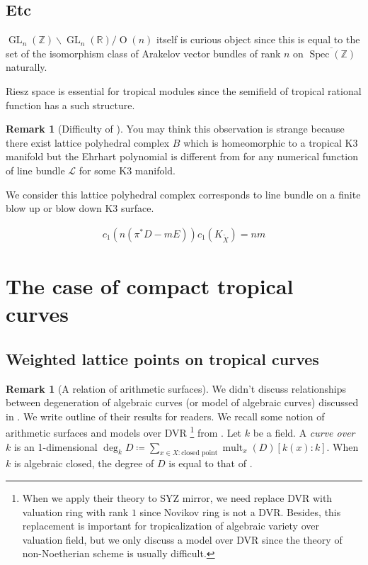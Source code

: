\documentclass[a4paper,dvipdfmx,reqno,12pt]{amsart}
\makeatletter
\newcommand{\ind}[2]{\emph{#1}\index{1{#2}@{#1}}}
\theoremstyle{definition}
\newtheorem{Rmk}[Thm]{Remark}
\newcommand{\deq}{\coloneqq}
\newcommand{\R}{\mathbb{R}}%
\newcommand{\Z}{\mathbb{Z}}%
\newcommand{\mcal}[1]{\mathcal{#1}}%
\newcommand{\opn}[1]{\operatorname{#1}}
\numberwithin{equation}{section}
\makeatother
\begin{document}
\subsection{Etc}

$\opn{GL}_{n}(\Z)\backslash \opn{GL}_{n}(\R)/\opn{O}(n)$ itself
is curious object since this is equal to the set of
the isomorphism class of Arakelov vector bundles of rank $n$ on $\overline{\opn{Spec}(\Z)}$ naturally.

Riesz space is essential for tropical modules since the semifield of tropical rational function
has a such structure.

\begin{Rmk}[Difficulty of ]

  You may think this observation is strange because
  there exist lattice polyhedral
  complex $B$ which is homeomorphic to
  a tropical K3 manifold but the Ehrhart polynomial is different from
  for any numerical function of line bundle $\mcal{L}$ for some K3 manifold.

  We consider this lattice polyhedral complex corresponds to line bundle on
  a finite blow up or blow down K3 surface.

  \begin{align}
    c_1(n(\pi^{*}D-mE))c_1(K_{\tilde{X}})=nm
  \end{align}




\end{Rmk}

\section{The case of compact tropical curves}

\subsection{Weighted lattice points on tropical curves}

\begin{Rmk}[A relation of arithmetic surfaces]
  We didn't discuss relationships between degeneration of algebraic curves (or model of algebraic curves) discussed in \cite{MR2448666,MR4131998,MR4251610}. We write outline of their results for readers. We recall some notion of arithmetic surfaces and models over DVR \footnote{When we apply their theory to SYZ mirror, we need replace DVR with valuation ring with rank $1$ since Novikov ring is not a DVR. Besides, this replacement is important for tropicalization of algebraic variety over valuation field, but we only discuss a model over DVR since the theory of non-Noetherian scheme is usually difficult.} from \cite[Chapter 9]{MR1917232}.
  Let $k$ be a field.
  A \ind{curve over $k$}{curve over k} is an 1-dimensional
  $\opn{deg}_k D\deq \sum_{x \in X: \text{closed point}}\opn{mult}_{x}(D)[k(x):k]$.
  When $k$ is algebraic closed, the degree of $D$ is equal to that of \cite[p.]{hartshorneAlgebraicGeometry1977a}.

\end{Rmk}

\small







\printindex
\end{document}
